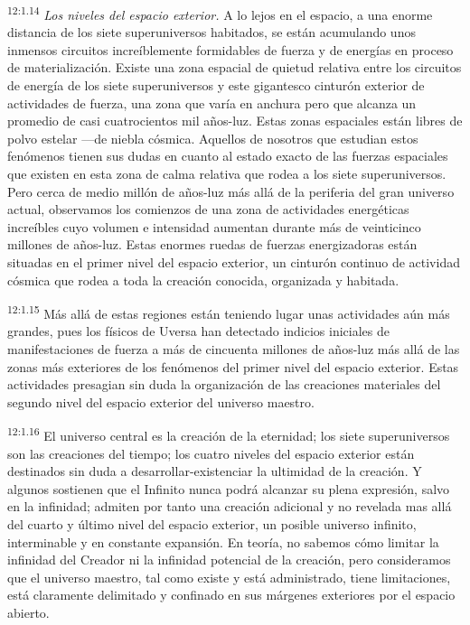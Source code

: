 \par
\textsuperscript{12:1.14} \textit{Los niveles del espacio exterior.} A lo lejos en el espacio, a una enorme distancia de los siete superuniversos habitados, se están acumulando unos inmensos circuitos increíblemente formidables de fuerza y de energías en proceso de materialización. Existe una zona espacial de quietud relativa entre los circuitos de energía de los siete superuniversos y este gigantesco cinturón exterior de actividades de fuerza, una zona que varía en anchura pero que alcanza un promedio de casi cuatrocientos mil años-luz. Estas zonas espaciales están libres de polvo estelar ---de niebla cósmica. Aquellos de nosotros que estudian estos fenómenos tienen sus dudas en cuanto al estado exacto de las fuerzas espaciales que existen en esta zona de calma relativa que rodea a los siete superuniversos. Pero cerca de medio millón de años-luz más allá de la periferia del gran universo actual, observamos los comienzos de una zona de actividades energéticas increíbles cuyo volumen e intensidad aumentan durante más de veinticinco millones de años-luz. Estas enormes ruedas de fuerzas energizadoras están situadas en el primer nivel del espacio exterior, un cinturón continuo de actividad cósmica que rodea a toda la creación conocida, organizada y habitada.

\par
\textsuperscript{12:1.15} Más allá de estas regiones están teniendo lugar unas actividades aún más grandes, pues los físicos de Uversa han detectado indicios iniciales de manifestaciones de fuerza a más de cincuenta millones de años-luz más allá de las zonas más exteriores de los fenómenos del primer nivel del espacio exterior. Estas actividades presagian sin duda la organización de las creaciones materiales del segundo nivel del espacio exterior del universo maestro.

\par
\textsuperscript{12:1.16} El universo central es la creación de la eternidad; los siete superuniversos son las creaciones del tiempo; los cuatro niveles del espacio exterior están destinados sin duda a desarrollar-existenciar la ultimidad de la creación. Y algunos sostienen que el Infinito nunca podrá alcanzar su plena expresión, salvo en la infinidad; admiten por tanto una creación adicional y no revelada mas allá del cuarto y último nivel del espacio exterior, un posible universo infinito, interminable y en constante expansión. En teoría, no sabemos cómo limitar la infinidad del Creador ni la infinidad potencial de la creación, pero consideramos que el universo maestro, tal como existe y está administrado, tiene limitaciones, está claramente delimitado y confinado en sus márgenes exteriores por el espacio abierto.

